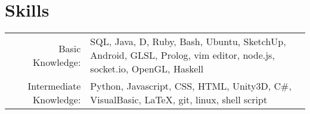 \section{Skills}
\begin{tabular}{r p{12cm}<{\hfill}}
	Basic Knowledge:	&	SQL, Java, D, Ruby, Bash, Ubuntu, SketchUp, Android, 
  GLSL, Prolog, vim editor, node.js, socket.io, OpenGL, Haskell\\
	Intermediate Knowledge: &	Python, Javascript, CSS, HTML, Unity3D, 
  C\#, VisualBasic, \LaTeX, git, linux, shell script\\
\end{tabular}
